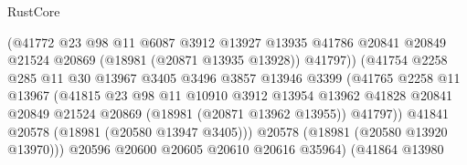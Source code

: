\begin{lexlean}{RustCore}
\begin{coremodule}
                                    (@41772
                                      @23
                                      @98
                                      @11
                                      @6087
                                      @3912
                                      @13927
                                      @13935
                                      @41786
                                      @20841
                                      @20849
                                      @21524
                                      @20869
                                      (@18981 (@20871 @13935 @13928))
                                      @41797))
                                  (@41754
                                    @2258
                                    @285
                                    @11
                                    @30
                                    @13967
                                    @3405
                                    @3496
                                    @3857
                                    @13946
                                    @3399
                                    (@41765
                                      @2258
                                      @11
                                      @13967
                                      (@41815
                                        @23
                                        @98
                                        @11
                                        @10910
                                        @3912
                                        @13954
                                        @13962
                                        @41828
                                        @20841
                                        @20849
                                        @21524
                                        @20869
                                        (@18981 (@20871 @13962 @13955))
                                        @41797))
                                    @41841
                                    @20578
                                    (@18981 (@20580 @13947 @3405)))
                                  @20578
                                  (@18981 (@20580 @13920 @13970)))
                                @20596
                                @20600
                                @20605
                                @20610
                                @20616
                                @35964)
                              (@41864
                                @13980

\end{coremodule}
\end{lexlean}
